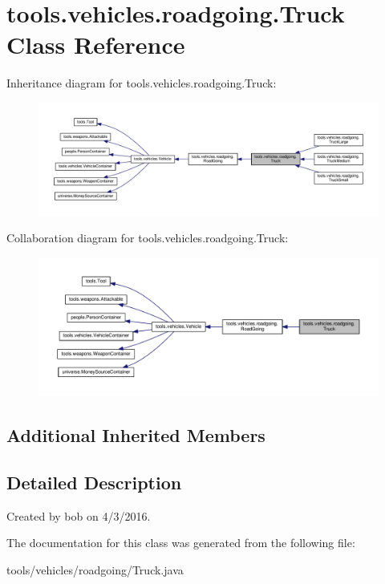 \hypertarget{classtools_1_1vehicles_1_1roadgoing_1_1_truck}{}\section{tools.\+vehicles.\+roadgoing.\+Truck Class Reference}
\label{classtools_1_1vehicles_1_1roadgoing_1_1_truck}


Inheritance diagram for tools.\+vehicles.\+roadgoing.\+Truck\+:\nopagebreak
\begin{figure}[H]
\begin{center}
\leavevmode
\includegraphics[width=350pt]{classtools_1_1vehicles_1_1roadgoing_1_1_truck__inherit__graph}
\end{center}
\end{figure}


Collaboration diagram for tools.\+vehicles.\+roadgoing.\+Truck\+:\nopagebreak
\begin{figure}[H]
\begin{center}
\leavevmode
\includegraphics[width=350pt]{classtools_1_1vehicles_1_1roadgoing_1_1_truck__coll__graph}
\end{center}
\end{figure}
\subsection*{Additional Inherited Members}


\subsection{Detailed Description}
Created by bob on 4/3/2016. 

The documentation for this class was generated from the following file\+:\begin{DoxyCompactItemize}
\item 
tools/vehicles/roadgoing/Truck.\+java\end{DoxyCompactItemize}
